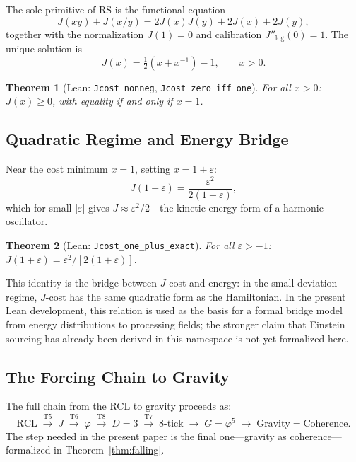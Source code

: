 \documentclass[11pt,a4paper]{article}
\newtheorem{theorem}{Theorem}[section]
\newcommand{\Jcost}{J}
\newcommand{\lean}[1]{\texttt{\small #1}}
\begin{document}
The sole primitive of RS is the functional equation
\begin{equation}\label{eq:RCL}
    \Jcost(xy) + \Jcost(x/y) = 2\Jcost(x)\Jcost(y) + 2\Jcost(x) + 2\Jcost(y),
\end{equation}
together with the normalization $\Jcost(1) = 0$ and calibration $\Jcost''_{\log}(0) = 1$.
The unique solution is~\cite{washburn2025}
\begin{equation}\label{eq:Jcost}
    \Jcost(x) = \tfrac{1}{2}(x + x^{-1}) - 1, \qquad x > 0.
\end{equation}

\begin{theorem}[Lean: \lean{Jcost\_nonneg}, \lean{Jcost\_zero\_iff\_one}]
    For all $x > 0$: $\Jcost(x) \geq 0$, with equality if and only if $x = 1$.
\end{theorem}

\subsection{Quadratic Regime and Energy Bridge}

Near the cost minimum $x = 1$, setting $x = 1 + \varepsilon$:
\begin{equation}\label{eq:quadratic}
    \Jcost(1 + \varepsilon) = \frac{\varepsilon^2}{2(1 + \varepsilon)},
\end{equation}
which for small $|\varepsilon|$ gives $\Jcost \approx \varepsilon^2/2$---the kinetic-energy form of a harmonic oscillator.

\begin{theorem}[Lean: \lean{Jcost\_one\_plus\_exact}]
    For all $\varepsilon > -1$:
    $\Jcost(1 + \varepsilon) = \varepsilon^2 / [2(1 + \varepsilon)]$.
\end{theorem}

This identity is the bridge between $J$-cost and energy: in the small-deviation regime, $J$-cost has the same quadratic form as the Hamiltonian.
In the present Lean development, this relation is used as the basis for a formal bridge model from energy distributions to processing fields; the stronger claim that Einstein sourcing has already been derived in this namespace is not yet formalized here.

\subsection{The Forcing Chain to Gravity}

The full chain from the RCL to gravity proceeds as:
\[
    \text{RCL} \;\xrightarrow{\text{T5}}\; \Jcost \;\xrightarrow{\text{T6}}\; \varphi \;\xrightarrow{\text{T8}}\; D{=}3 \;\xrightarrow{\text{T7}}\; 8\text{-tick} \;\xrightarrow{}\; G = \varphi^5 \;\xrightarrow{}\; \text{Gravity} = \text{Coherence}.
\]
The step needed in the present paper is the final one---gravity as coherence---formalized in Theorem~\ref{thm:falling}.
\end{document}
